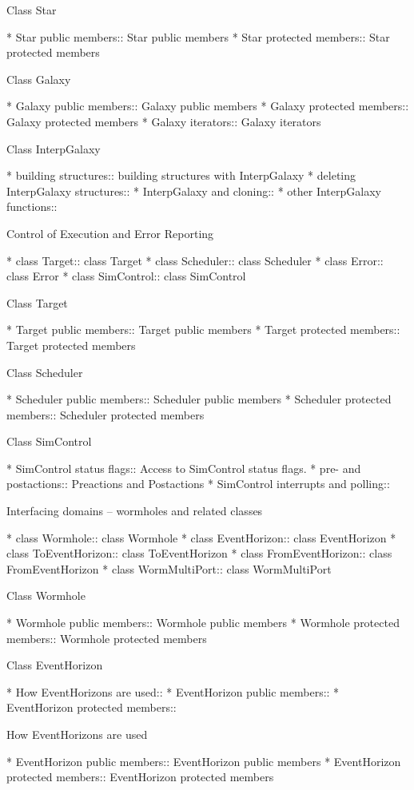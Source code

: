 Class Star

* Star public members::  Star public members
* Star protected members::  Star protected members

Class Galaxy

* Galaxy public members::  Galaxy public members
* Galaxy protected members::  Galaxy protected members
* Galaxy iterators::  Galaxy iterators

Class InterpGalaxy

* building structures::  building structures with InterpGalaxy
* deleting InterpGalaxy structures::  
* InterpGalaxy and cloning::  
* other InterpGalaxy functions::  

Control of Execution and Error Reporting

* class Target::    class Target
* class Scheduler::  class Scheduler
* class Error::     class Error
* class SimControl::  class SimControl

Class Target

* Target public members::  Target public members
* Target protected members::  Target protected members

Class Scheduler

* Scheduler public members::  Scheduler public members
* Scheduler protected members::  Scheduler protected members

Class SimControl

* SimControl status flags::  Access to SimControl status flags.
* pre- and postactions::  Preactions and Postactions
* SimControl interrupts and polling::  

Interfacing domains -- wormholes and related classes

* class Wormhole::  class Wormhole
* class EventHorizon::  class EventHorizon
* class ToEventHorizon::  class ToEventHorizon
* class FromEventHorizon::  class FromEventHorizon
* class WormMultiPort::  class WormMultiPort

Class Wormhole

* Wormhole public members::  Wormhole public members
* Wormhole protected members::  Wormhole protected members

Class EventHorizon

* How EventHorizons are used::  
* EventHorizon public members::  
* EventHorizon protected members::  

How EventHorizons are used

* EventHorizon public members::  EventHorizon public members
* EventHorizon protected members::  EventHorizon protected members

